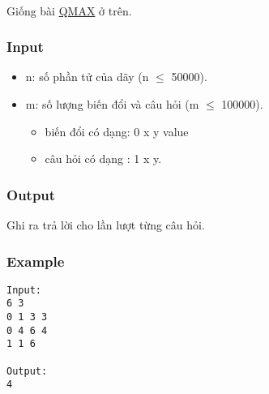 

 

Giống bài \href{http://vnoi.info/problems/show/QMAX/}{QMAX} ở trên.

\subsubsection{Input}
\begin{itemize}
	\item n: số phần tử của dãy (n  $\le$  50000).
	\item m: số lượng biến đổi và câu hỏi (m  $\le$  100000).
\begin{itemize}
	\item biến đổi có dạng: 0 x y value
	\item câu hỏi có dạng : 1 x y.
\end{itemize}
\end{itemize}

\subsubsection{Output}

Ghi ra trả lời cho lần lượt từng câu hỏi.

\subsubsection{Example}
\begin{verbatim}
Input:
6 3
0 1 3 3
0 4 6 4
1 1 6

Output:
4
\end{verbatim}
